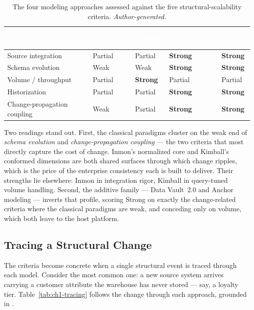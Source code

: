 \begin{table}[H]
\centering
\renewcommand{\arraystretch}{1.35}
\caption{The four modeling approaches assessed against the five structural-scalability criteria. \textit{Author-generated.}}
\label{tab:ch1-comparison}
\begin{tabularx}{\linewidth}{|>{\raggedright\arraybackslash}p{3.5cm}|>{\centering\arraybackslash}X|>{\centering\arraybackslash}X|>{\centering\arraybackslash}X|>{\centering\arraybackslash}X|}
\hline
\rowcolor{tblheader}
\textcolor{white}{\textbf{Criterion}} &
\textcolor{white}{\textbf{Inmon CIF}} &
\textcolor{white}{\textbf{Kimball}} &
\textcolor{white}{\textbf{Data Vault 2.0}} &
\textcolor{white}{\textbf{Anchor}} \\
\hline
Source integration & Partial & Partial & \textbf{Strong} & \textbf{Strong} \\
Schema evolution & Weak & Weak & \textbf{Strong} & \textbf{Strong} \\
Volume / throughput & Partial & \textbf{Strong} & Partial & Partial \\
Historization & Partial & Partial & \textbf{Strong} & \textbf{Strong} \\
Change-propagation coupling & Weak & Partial & \textbf{Strong} & \textbf{Strong} \\
\hline
\end{tabularx}
\end{table}

Two readings stand out. First, the classical paradigms cluster on the weak end of \textit{schema evolution} and \textit{change-propagation coupling} --- the two criteria that most directly capture the cost of change. Inmon's normalized core and Kimball's conformed dimensions are both shared surfaces through which change ripples, which is the price of the enterprise consistency each is built to deliver. Their strengths lie elsewhere: Inmon in integration rigor, Kimball in query-tuned volume handling. Second, the additive family --- Data Vault~2.0 and Anchor modeling --- inverts that profile, scoring Strong on exactly the change-related criteria where the classical paradigms are weak, and conceding only on volume, which both leave to the host platform.

\subsection{Tracing a Structural Change}
\label{subsec:ch1-tracing}

The criteria become concrete when a single structural event is traced through each model. Consider the most common one: a new source system arrives carrying a customer attribute the warehouse has never stored --- say, a loyalty tier. Table~\ref{tab:ch1-tracing} follows the change through each approach, grounded in \parencite{inmon2005, kimball2013, linstedt2015, ronnback2010anchor}.

